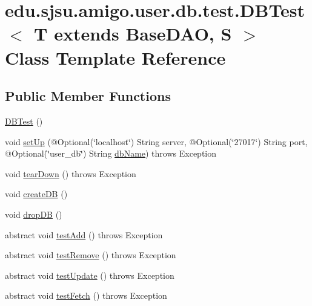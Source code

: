 \hypertarget{classedu_1_1sjsu_1_1amigo_1_1user_1_1db_1_1test_1_1_d_b_test}{}\section{edu.\+sjsu.\+amigo.\+user.\+db.\+test.\+D\+B\+Test$<$ T extends Base\+D\+AO, S $>$ Class Template Reference}
\label{classedu_1_1sjsu_1_1amigo_1_1user_1_1db_1_1test_1_1_d_b_test}
\subsection*{Public Member Functions}
\begin{DoxyCompactItemize}
\item 
\hyperlink{classedu_1_1sjsu_1_1amigo_1_1user_1_1db_1_1test_1_1_d_b_test_a2bc89c29bb2b7a7ba50ce057c4da847e}{D\+B\+Test} ()
\item 
void \hyperlink{classedu_1_1sjsu_1_1amigo_1_1user_1_1db_1_1test_1_1_d_b_test_ad45f09de863c6824c0bebdb308b94bf7}{set\+Up} (@Optional(\char`\"{}localhost\char`\"{}) String server, @Optional(\char`\"{}27017\char`\"{}) String port, @Optional(\char`\"{}user\+\_\+db\char`\"{}) String \hyperlink{classedu_1_1sjsu_1_1amigo_1_1user_1_1db_1_1test_1_1_d_b_test_a3f2573ce874e023900d80922923c6900}{db\+Name})  throws Exception 
\item 
void \hyperlink{classedu_1_1sjsu_1_1amigo_1_1user_1_1db_1_1test_1_1_d_b_test_adfbadef8f2b0158b57e6fed4985ee19c}{tear\+Down} ()  throws Exception 
\item 
void \hyperlink{classedu_1_1sjsu_1_1amigo_1_1user_1_1db_1_1test_1_1_d_b_test_a5c7a1235c61d59451a19874e8c06b2ac}{create\+DB} ()
\item 
void \hyperlink{classedu_1_1sjsu_1_1amigo_1_1user_1_1db_1_1test_1_1_d_b_test_a0143d91f1c2120b6e72a2c1724b1beae}{drop\+DB} ()
\item 
abstract void \hyperlink{classedu_1_1sjsu_1_1amigo_1_1user_1_1db_1_1test_1_1_d_b_test_a3d3d0f732c1d1d9f5cd5f526e9ae1804}{test\+Add} ()  throws Exception
\item 
abstract void \hyperlink{classedu_1_1sjsu_1_1amigo_1_1user_1_1db_1_1test_1_1_d_b_test_a02143d06d162d133b30a34a6c410dc0d}{test\+Remove} ()  throws Exception
\item 
abstract void \hyperlink{classedu_1_1sjsu_1_1amigo_1_1user_1_1db_1_1test_1_1_d_b_test_a8f405b851739579f07a5d93573840e25}{test\+Update} ()  throws Exception
\item 
abstract void \hyperlink{classedu_1_1sjsu_1_1amigo_1_1user_1_1db_1_1test_1_1_d_b_test_a0609cbc687512b402b1dc47ada47ede5}{test\+Fetch} ()  throws Exception
\end{DoxyCompactItemize}
